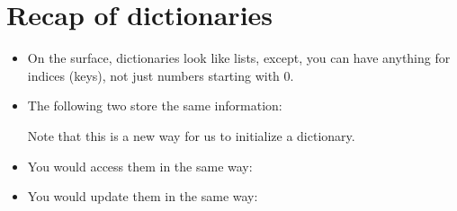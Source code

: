\documentclass[letterpaper,10pt,english]{sphinxmanual}
\begin{document}
\section{Recap of dictionaries}
\label{\detokenize{lecture_notes/lec17_dictionaries2:recap-of-dictionaries}}\begin{itemize}
\item {} 
On the surface, dictionaries look like lists, except, you can have
anything for indices (keys), not just numbers starting with 0.

\item {} 
The following two store the same information:

\begin{sphinxVerbatim}[commandchars=\\\{\}]
  \PYG{p}{[}\PYG{p}{]}
     
\end{sphinxVerbatim}

Note that this is a new way for us to initialize a dictionary.

\item {} 
You would access them in the same way:

\begin{sphinxVerbatim}[commandchars=\\\{\}]
\PYG{p}{[}\PYG{p}{]}
\PYG{p}{[}\PYG{p}{]}
\end{sphinxVerbatim}

\item {} 
You would update them in the same way:

\begin{sphinxVerbatim}[commandchars=\\\{\}]
\PYG{p}{[}\PYG{p}{]}  
\PYG{p}{[}\PYG{p}{]}  
\end{sphinxVerbatim}


\end{itemize}
\end{document}
